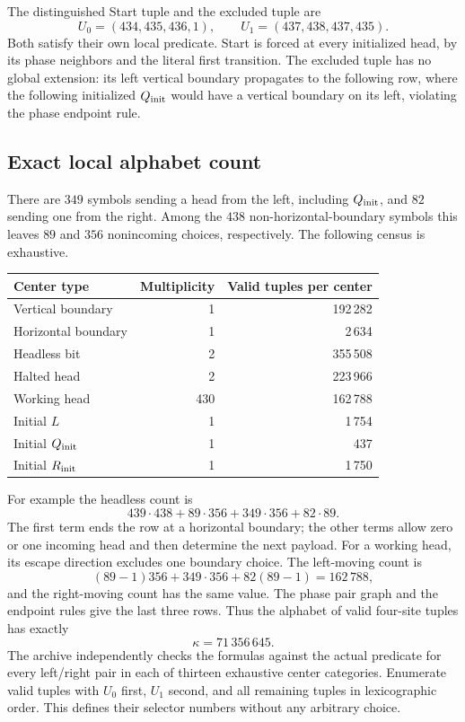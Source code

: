 \documentclass[11pt,a4paper]{article}
\theoremstyle{remark}\newtheorem{remark}[theorem]{Remark}
\begin{document}
The distinguished Start tuple and the excluded tuple are
\[
 U_0=(434,435,436,1),\qquad U_1=(437,438,437,435).
\]
Both satisfy their own local predicate. Start is forced at every
initialized head, by its phase neighbors and the literal first
transition. The excluded tuple has no global extension: its left
vertical boundary propagates to the following row, where the
following initialized $Q_{\rm init}$ would have a vertical boundary
on its left, violating the phase endpoint rule.

\subsection{Exact local alphabet count}

There are $349$ symbols sending a head from the left, including
$Q_{\rm init}$, and $82$ sending one from the right. Among the $438$
non-horizontal-boundary symbols this leaves $89$ and $356$
nonincoming choices, respectively. The following census is exhaustive.
\begin{center}\small
\begin{tabular}{lrr}
\toprule
Center type & Multiplicity & Valid tuples per center\\
\midrule
Vertical boundary &1&192\,282\\
Horizontal boundary &1&2\,634\\
Headless bit &2&355\,508\\
Halted head &2&223\,966\\
Working head &430&162\,788\\
Initial $L$ &1&1\,754\\
Initial $Q_{\rm init}$ &1&437\\
Initial $R_{\rm init}$ &1&1\,750\\
\bottomrule
\end{tabular}
\end{center}
For example the headless count is
\[
 439\cdot438+89\cdot356+349\cdot356+82\cdot89.
\]
The first term ends the row at a horizontal boundary; the other terms
allow zero or one incoming head and then determine the next payload.
For a working head, its escape direction excludes one boundary
choice. The left-moving count is
\[
 (89-1)356+349\cdot356+82(89-1)=162\,788,
\]
and the right-moving count has the same value. The phase pair graph
and the endpoint rules give the last three rows. Thus the alphabet
of valid four-site tuples has exactly
\[
 \boxed{\ \kappa=71\,356\,645.\ }
\]
The archive independently checks the formulas against the actual
predicate for every left/right pair in each of thirteen exhaustive
center categories. Enumerate valid tuples with $U_0$ first,
$U_1$ second, and all remaining tuples in lexicographic order.
This defines their selector numbers without any arbitrary choice.
\end{document}
